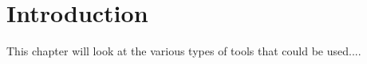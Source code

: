 
\section*{Introduction}
This chapter will look at the various types of tools that could be used....